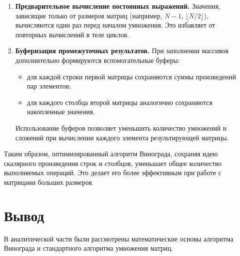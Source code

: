 \begin{enumerate}
	\item \textbf{Предварительное вычисление постоянных выражений.}  
	Значения, зависящие только от размеров матриц (например, $N-1$, $\lfloor N/2 \rfloor$), вычисляются один раз перед началом умножения. Это избавляет от повторных вычислений в теле циклов.
	
	\item \textbf{Буферизация промежуточных результатов.}  
	При заполнении массивов дополнительно формируются вспомогательные буферы:  
	\begin{itemize}
		\item для каждой строки первой матрицы сохраняются суммы произведений пар элементов;
		\item для каждого столбца второй матрицы аналогично сохраняются накопленные значения.
	\end{itemize}
	Использование буферов позволяет уменьшить количество умножений и сложений при вычислении каждого элемента результирующей матрицы.
\end{enumerate}

Таким образом, оптимизированный алгоритм Винограда, сохраняя идею скалярного произведения строк и столбцов, уменьшает общее количество выполняемых операций. Это делает его более эффективным при работе с матрицами больших размеров.

\section*{Вывод}

В аналитической части были рассмотрены математические основы алгоритма Винограда и стандартного алгоритма умножения матриц.

\clearpage

